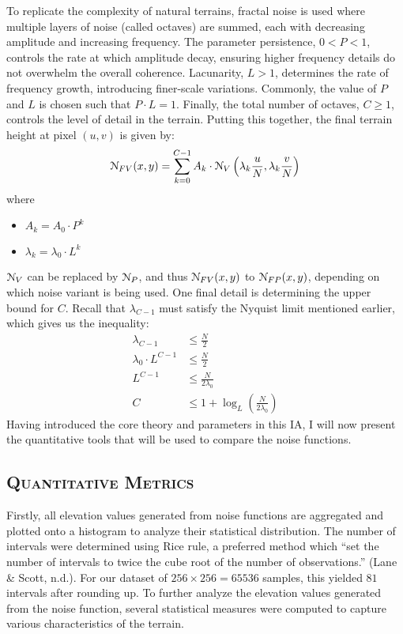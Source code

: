 To replicate the complexity of natural terrains, fractal noise is used where multiple layers of noise (called octaves) are summed, each with 
decreasing amplitude and increasing frequency. The parameter persistence, $0<P<1$, controls the rate at which amplitude decay, ensuring higher 
frequency details do not overwhelm the overall coherence. Lacunarity, $L>1$, determines the rate of frequency growth, introducing finer-scale 
variations. Commonly, the value of $P$ and $L$ is chosen such that $P\cdot L=1$. Finally, the total number of octaves, $C\ge 1$, controls the level of detail in the terrain. Putting this together, the final terrain 
height at pixel $(u,v)$ is given by:
\[\EuScript{N}_{FV}(x,y)=\sum_{k=0}^{C-1}A_k\cdot\EuScript{N}_V\left(\lambda_k\frac{u}{N},\lambda_k\frac{v}{N}\right)\]
where
\begin{itemize}
    \item $A_k=A_0\cdot P^k$
    \item $\lambda_k=\lambda_0\cdot L^k$
\end{itemize}
$\EuScript{N}_V$ can be replaced by $\EuScript{N}_P$, and thus $\EuScript{N}_{FV}(x,y)$ to $\EuScript{N}_{FP}(x,y)$, depending on which noise variant 
is being used. One final detail is determining the upper bound for $C$. Recall that $\lambda_{C-1}$ must satisfy the Nyquist limit mentioned earlier, 
which gives us the inequality:
\begin{align*}
    \lambda_{C-1}&\le \frac{N}{2}\\
    \lambda_0\cdot L^{C-1} &\le \frac{N}{2}\\
    L^{C-1} &\le \frac{N}{2\lambda_0}\\
    C &\le 1+\log_L\left(\frac{N}{2\lambda_0}\right)
\end{align*}
Having introduced the core theory and parameters in this IA, I will now present the quantitative tools that will be used to compare the noise functions.

\subsection{\textsc{Quantitative Metrics}} \label{quant_metrics}
\vspace*{-10pt}

Firstly, all elevation values generated from noise functions are aggregated and plotted onto a histogram to analyze their statistical distribution. The 
number of intervals were determined using Rice rule, a preferred method which “set the number of intervals to twice the cube root of the number of 
observations.” (Lane \& Scott, n.d.). For our dataset of $256\times256=65536$ samples, this yielded $81$ intervals after rounding up. To further analyze 
the elevation values generated from the noise function, several statistical measures were computed to capture various characteristics of the terrain.

